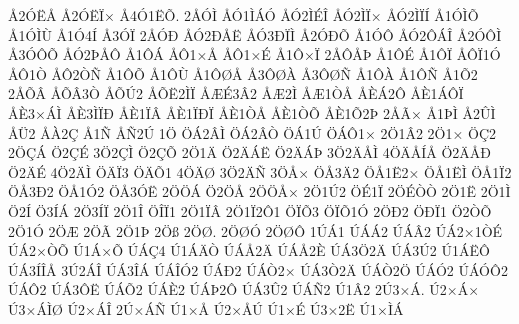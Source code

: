 {^^c52^^d3^^cb^^c5
^^c52^^d3^^cb^^cf^^d7
^^c54^^d31^^cb^^d5.
2^^c5^^d3^^cc
^^c5^^d31^^cc^^c1^^d3
^^c5^^d32^^cc^^c9^^ce
^^c5^^d32^^cc^^cf^^d7
^^c5^^d32^^cc^^cf^^cd
^^c51^^d3^^cc^^d5
^^c51^^d3^^cc^^d9
^^c51^^d34^^cd
^^c53^^d3^^cf
2^^c5^^d3^^d0
^^c5^^d32^^d0^^c5^^cb
^^c5^^d33^^d0^^cf^^cc
^^c52^^d3^^d0^^d5
^^c51^^d3^^d4
^^c5^^d32^^d4^^c1^^ce
^^c52^^d3^^d4^^cc
^^c53^^d3^^d4^^d5
^^c5^^d32^^de^^c5^^d4
^^c51^^d4^^c1
^^c5^^d41^^d7^^c5
^^c5^^d41^^d7^^c9
^^c51^^d4^^d7^^cf
2^^c5^^d4^^c5^^de
^^c51^^d4^^c9
^^c51^^d4^^cf
^^c5^^d4^^cf1^^d3
^^c5^^d41^^d2
^^c5^^d42^^d2^^d1
^^c51^^d4^^d5
^^c51^^d4^^d9
^^c51^^d4^^d8^^c5
^^c53^^d4^^d8^^c0
^^c53^^d4^^d8^^d1
^^c51^^d4^^c0
^^c51^^d4^^d1
^^c51^^d52
2^^c5^^d5^^c2
^^c5^^d5^^c23^^d2
^^c5^^d5^^da2
^^c5^^d5^^cb2^^cc^^cf
^^c5^^c6^^c93^^c22
^^c5^^c62^^cc
^^c5^^c61^^d2^^c5
^^c5^^c8^^c12^^d4
^^c5^^c81^^c1^^d4^^cf
^^c5^^c83^^d7^^c1^^cc
^^c5^^c83^^cc^^cf^^d0
^^c5^^c81^^cf^^c2
^^c5^^c81^^cf^^d0^^cf
^^c5^^c81^^d2^^c5
^^c5^^c81^^d2^^d5
^^c5^^c81^^d52^^de
2^^c5^^c3^^d7
^^c51^^de^^cc
^^c52^^db^^cc
^^c5^^dc2
^^c5^^c02^^c7
^^c51^^d1
^^c5^^d12^^da
1^^d6
^^d6^^c12^^c2^^cc
^^d6^^c12^^c2^^d2
^^d6^^c11^^da
^^d6^^c1^^d41^^d7
2^^d61^^c22
2^^d61^^d7
^^d6^^c72
2^^d6^^c7^^c1
^^d62^^c7^^c9
3^^d62^^c7^^cc
^^d62^^c7^^d5
2^^d61^^c4
^^d62^^c4^^c1^^cb
^^d62^^c4^^c1^^de
3^^d62^^c4^^c5^^cc
4^^d6^^c4^^c5^^cd^^c5
^^d62^^c4^^c5^^d0
^^d62^^c4^^c9
4^^d62^^c4^^cc
^^d6^^c4^^cf3
^^d6^^c4^^d51
4^^d6^^c4^^d8
3^^d62^^c4^^d1
3^^d6^^c5^^d7
^^d6^^c53^^c42
^^d6^^c51^^cb2^^d7
^^d6^^c51^^cb^^cc
^^d6^^c51^^cf2
^^d6^^c53^^d02
^^d6^^c51^^d32
^^d6^^c53^^d3^^cb
2^^d6^^d6^^c1
^^d62^^d6^^c5
2^^d6^^d6^^c5^^d7
2^^d61^^da2
^^d6^^c91^^cf
2^^d6^^c9^^d2^^d2
2^^d61^^cb
2^^d61^^cc
^^d62^^cd
^^d63^^cd^^c1
2^^d63^^cd^^cf
2^^d61^^ce
^^d6^^ce^^cf1
2^^d61^^cf^^c2
2^^d61^^cf2^^d41
^^d6^^cf^^d53
^^d6^^cf^^d51^^d3
2^^d6^^d02
^^d6^^d0^^cf1
^^d62^^d2^^d5
2^^d61^^d3
2^^d6^^c6
2^^d6^^c3
2^^d61^^de
2^^d6^^df
2^^d6^^d8.
2^^d6^^d8^^d3
2^^d6^^d8^^d4
1^^da^^c11
^^da^^c1^^c12
^^da^^c1^^c22
^^da^^c12^^d71^^d2^^c9
^^da^^c12^^d7^^d2^^d5
^^da1^^c1^^d7^^d5
^^da^^c1^^c74
^^da1^^c1^^c4^^d2
^^da^^c1^^c52^^c4
^^da^^c1^^c52^^c8
^^da^^c13^^d62^^c4
^^da^^c13^^da2
^^da1^^c1^^cb^^d4
^^da^^c13^^cd^^ce^^c5
3^^da2^^c1^^ce
^^da^^c13^^ce^^c1
^^da^^c1^^ce^^d32
^^da^^c1^^d02
^^da^^c1^^d22^^d7
^^da^^c13^^d22^^c4
^^da^^c1^^d22^^d6
^^da^^c1^^d32
^^da^^c1^^d3^^d42
^^da^^c1^^d42
^^da^^c13^^d4^^cb
^^da^^c1^^d52
^^da^^c1^^c82
^^da^^c1^^de2^^d4
^^da^^c13^^db2
^^da^^c1^^d12
^^da1^^c22
2^^da3^^d7^^c1.
^^da2^^d7^^c1^^d7
^^da3^^d7^^c1^^cc^^d8
^^da2^^d7^^c1^^ce
2^^da^^d7^^c1^^d1
^^da1^^d7^^c5
^^da2^^d7^^c5^^da
^^da1^^d7^^c9
^^da3^^d72^^cb
^^da1^^d7^^cc^^c1
}
